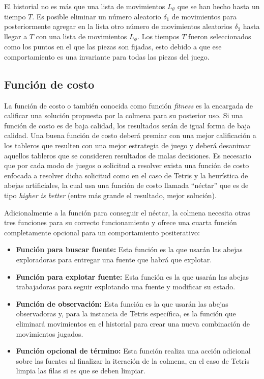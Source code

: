 El historial no es más que una lista de movimientos $L_{\theta}$ que se han hecho hasta un 
tiempo $T$. Es posible eliminar un número aleatorio $\delta_{1}$ de movimientos 
para posteriormente agregar en la lista otro número de movimientos aleatorios $\delta_{2}$ hasta 
llegar a $T$ con una lista de movimientos $L_{\phi}$. Los tiempos $T$ fueron seleccionados 
como los puntos en 
el que las piezas son fijadas, esto debido a que ese comportamiento es una invariante 
para todas las piezas del juego.



\subsection{Función de costo}

La función de costo o también conocida como función \textit{fitness} es la encargada 
de calificar una solución propuesta por la colmena para su posterior uso. 
Si una función de costo es de baja calidad, los resultados serán de igual forma 
de baja calidad. Una buena función de costo deberá premiar con una mejor 
calificación a los tableros que resulten con una mejor estrategia de juego y 
deberá desanimar aquellos tableros que se consideren resultados de malas decisiones. Es 
necesario que por cada modo de juegos o solicitud a resolver exista una función 
de costo enfocada a resolver dicha solicitud como en el caso de Tetris y la 
heurística de abejas artificiales, la cual usa una función de costo llamada 
``néctar'' que es de tipo \textit{higher is better} (entre más grande el 
resultado, mejor solución).

Adicionalmente a la función para conseguir el néctar, la colmena necesita 
otras tres funciones para su correcto funcionamiento y ofrece una cuarta 
función completamente opcional para un comportamiento positerativo: %

\begin{itemize}
\item\textbf{Función para buscar fuente:} Esta función es la que usarán 
las abejas exploradoras para entregar una fuente que habrá que explotar.

\item\textbf{Función para explotar fuente:} Esta función es la que usarán 
las abejas trabajadoras para seguir explotando una fuente y modificar su estado.

\item\textbf{Función de observación:} Esta función es la que usarán 
las abejas observadoras y, para la instancia de Tetris específica, es la 
función que eliminará movimientos en el historial para crear una nueva 
combinación de movimientos jugados.

\item\textbf{Función opcional de término:} Esta función realiza una acción adicional 
sobre las fuentes al finalizar la iteración de la colmena, en el caso de Tetris 
limpia las filas si es que se deben limpiar.
\end{itemize}

